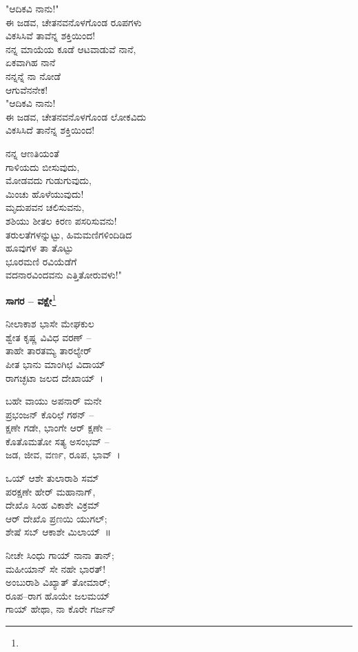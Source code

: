 "ಆದಿಕವಿ ನಾನು!"\\ಈ ಜಡವ, ಚೇತನವನೊಳಗೊಂಡ ರೂಪಗಳು\\ವಿಕಸಿಸಿವೆ ತಾವೆನ್ನ ಶಕ್ತಿಯಿಂದ!\\ನನ್ನ ಮಾಯೆಯ ಕೂಡೆ ಆಟವಾಡುವೆ ನಾನೆ,\\ಏಕವಾಗಿಹ ನಾನೆ\\ನನ್ನನ್ನೆ ನಾ ನೋಡೆ\\ಆಗುವೆನನೇಕ!\\

"ಆದಿಕವಿ ನಾನು!\\ಈ ಜಡವ, ಚೇತನವನೊಳಗೊಂಡ ಲೋಕವಿದು\\ವಿಕಸಿಸಿದೆ ತಾನೆನ್ನ ಶಕ್ತಿಯಿಂದ!

ನನ್ನ ಆಣತಿಯಂತೆ\\ಗಾಳಿಯದು ಬೀಸುವುದು,\\ಮೋಡವದು ಗುಡುಗುವುದು,\\ಮಿಂಚು ಹೊಳೆಯುವುದು!\\
 ಮೃದುಪವನ ಚಲಿಸುವನು,\\ಶಶಿಯು ಶೀತಲ ಕಿರಣ ಪಸರಿಸುವನು!\\ತರುಲತೆಗಳನ್ನುಟ್ಟು, ಹಿಮಮಣಿಗಳಿಂದಿಡಿದ\\ಹೂವುಗಳ ತಾ ತೊಟ್ಟು\\ಭೂರಮಣಿ ರವಿಯೆಡೆಗೆ\\ವದನಾರವಿಂದವನು ಎತ್ತಿತೋರುವಳು!"

\begin{center}
\textbf{ಸಾಗರ – ವಕ್ಷೇ}\footnote{}
\end{center}

ನೀಲಾಕಾಶ ಭಾಸೇ ಮೇಘಕುಲ\\ಶ್ವೇತ ಕೃಷ್ಣ ವಿವಿಧ ವರಣ್ –\\ತಾಹೇ ತಾರತಮ್ಯ ತಾರಲ್ಯೇರ್\\ಪೀತ ಭಾನು ಮಾಂಗಿಛ ವಿದಾಯ್\\ರಾಗಚ್ಛಟಾ ಜಲದ ದೇಖಾಯ್~।

ಬಹೇ ವಾಯು ಅಪನಾರ್ ಮನೇ\\ಪ್ರಭಂಜನ್ ಕೊರಿಛೆ ಗಠನ್ –\\ಕ್ಷಣೇ ಗಡೇ, ಭಾಂಗೇ ಆರ್ ಕ್ಷಣೇ –\\ಕೊತೊಮತೋ ಸತ್ಯ ಅಸಂಭವ್ –\\ಜಡ, ಜೀವ, ವರ್ಣ, ರೂಪ, ಭಾವ್~।

ಒಯ್ ಆಶೇ ತುಲಾರಾಶಿ ಸಮ್\\ಪರಕ್ಷಣೇ ಹೇರ್‌ ಮಹಾನಾಗ್,\\ದೇಖೊ ಸಿಂಹ ವಿಕಾಶೇ ವಿಕ್ರಮ್\\ಆರ್ ದೇಖೊ ಪ್ರಣಯಿ ಯುಗಲ್;\\ಶೇಷೆ ಸಬ್ ಆಕಾಶೇ ಮಿಲಾಯ್~॥

ನೀಚೇ ಸಿಂಧು ಗಾಯ್ ನಾನಾ ತಾನ್;\\ಮಹೀಯಾನ್ ಸೇ ನಹೇ ಭಾರತ್!\\ಅಂಬುರಾಶಿ ವಿಖ್ಯಾತ್ ತೋಮಾರ್;\\ರೂಪ–ರಾಗ ಹೊಯೇ ಜಲಮಯ್\\ಗಾಯ್ ಹೇಥಾ, ನಾ ಕೊರೇ ಗರ್ಜನ್

